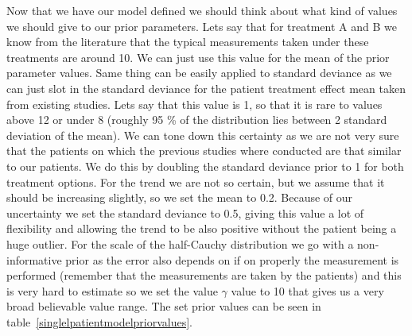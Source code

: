 \documentclass[12pt,a4paper,leqno]{report}
\theoremstyle{plain}
\theoremstyle{definition}
\theoremstyle{remark}
\begin{document}
\bigskip
{}
\bigskip


Now that we have our model defined we should think about what kind of values we should
give to our prior parameters. Lets say that for treatment A and B we know from the
literature that the typical measurements taken under these treatments are around 10. We
can just use this value for the mean of the prior parameter values. Same thing can be
easily applied to standard deviance as we can just slot in the standard deviance for the
patient treatment effect mean taken from existing studies. Lets say that this value is
1, so that it is rare to values above 12 or under 8 (roughly 95 \% of the distribution
lies between 2 standard deviation of the mean). We can tone down this certainty
as we are not very sure that the patients on which the previous studies where conducted
are that similar to our patients. We do this by doubling the standard deviance prior to 1 for both
treatment options. For the trend we are not so certain, but we assume that it should be
increasing slightly, so we set the mean to 0.2. Because of our uncertainty we set the
standard deviance to 0.5, giving this value a lot of flexibility and allowing the trend to be also
positive without the patient being a huge outlier. For the scale of the half-Cauchy
distribution we go with a non-informative prior as the error also depends on if on
properly the measurement is performed (remember that the measurements are taken by the
patients) and this is very hard to estimate so we set the value \(\gamma \) value to 10
that gives us a very broad believable value range. The set prior values can be seen
in table\ \ref{singlelpatientmodelpriorvalues}.
\end{document}

